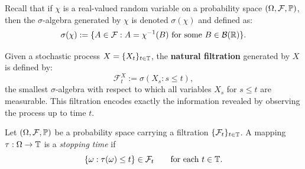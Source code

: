 

Recall that if \(\chi\) is a real-valued random variable on a probability space \((\Omega, \mathcal{F}, \mathbb{P})\), then the \(\sigma\)-algebra generated by \(\chi\) is denoted \(\sigma(\chi)\) and defined as:
\begin{equation}
\sigma(\chi) := \{ A \in \mathcal{F} : A = \chi^{-1}(B) \text{ for some } B \in \mathcal{B}(\mathbb{R}) \}.
\end{equation}

\begin{example}
Given a stochastic process \(X = \{X_t\}_{t \in \mathbb{T}}\), the \textbf{natural filtration} generated by \(X\) is defined by:
\begin{equation}
\mathcal{F}_t^X := \sigma(X_s : s \leq t),
\end{equation}
the smallest \(\sigma\)-algebra with respect to which all variables \(X_s\) for \(s \leq t\) are measurable. This filtration encodes exactly the information revealed by observing the process up to time \(t\).
\end{example}

\begin{definition}\label{stoppingTime}
Let $(\Omega,\mathcal{F}, \mathbb{P})$ be a probability space carrying a filtration $\{\mathcal{F}_t\}_{t\in\mathbb{T}}$. A mapping $\tau:\Omega \rightarrow \mathbb{T}$ is a \textit{stopping time} if
\[
\{\omega : \tau(\omega) \leq t\} \in \mathcal{F}_t \qquad \text{for each } t \in \mathbb{T} .
\]
\end{definition}

